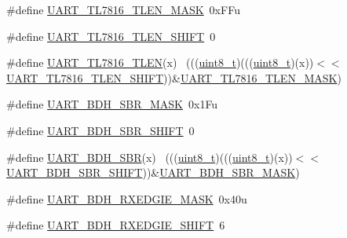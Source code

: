 \begin{DoxyCompactItemize}
\item 
\#define \hyperlink{group___u_a_r_t___register___masks_ga000fb6043015c4cb478d32febfb4a913}{U\+A\+R\+T\+\_\+\+T\+L7816\+\_\+\+T\+L\+E\+N\+\_\+\+M\+A\+SK}~0x\+F\+Fu
\item 
\#define \hyperlink{group___u_a_r_t___register___masks_gaafcee96c5728fbbbc56c3b2ea55bd753}{U\+A\+R\+T\+\_\+\+T\+L7816\+\_\+\+T\+L\+E\+N\+\_\+\+S\+H\+I\+FT}~0
\item 
\#define \hyperlink{group___u_a_r_t___register___masks_ga6665c13844ba2e5f1add9e33a5ae5d66}{U\+A\+R\+T\+\_\+\+T\+L7816\+\_\+\+T\+L\+EN}(x)                                        ~(((\hyperlink{_p_e___types_8h_aba7bc1797add20fe3efdf37ced1182c5}{uint8\+\_\+t})(((\hyperlink{_p_e___types_8h_aba7bc1797add20fe3efdf37ced1182c5}{uint8\+\_\+t})(x))$<$$<$\hyperlink{group___u_a_r_t___register___masks_gaafcee96c5728fbbbc56c3b2ea55bd753}{U\+A\+R\+T\+\_\+\+T\+L7816\+\_\+\+T\+L\+E\+N\+\_\+\+S\+H\+I\+FT}))\&\hyperlink{group___u_a_r_t___register___masks_ga000fb6043015c4cb478d32febfb4a913}{U\+A\+R\+T\+\_\+\+T\+L7816\+\_\+\+T\+L\+E\+N\+\_\+\+M\+A\+SK})
\item 
\#define \hyperlink{group___u_a_r_t___register___masks_ga2680dc8176b0c933b4a1b77c5dbb64b7}{U\+A\+R\+T\+\_\+\+B\+D\+H\+\_\+\+S\+B\+R\+\_\+\+M\+A\+SK}~0x1\+Fu
\item 
\#define \hyperlink{group___u_a_r_t___register___masks_gac38d8a98be282d97c4837597a6c02cda}{U\+A\+R\+T\+\_\+\+B\+D\+H\+\_\+\+S\+B\+R\+\_\+\+S\+H\+I\+FT}~0
\item 
\#define \hyperlink{group___u_a_r_t___register___masks_ga28b137858fb0891d9d7e15f3664803c4}{U\+A\+R\+T\+\_\+\+B\+D\+H\+\_\+\+S\+BR}(x)                                                ~(((\hyperlink{_p_e___types_8h_aba7bc1797add20fe3efdf37ced1182c5}{uint8\+\_\+t})(((\hyperlink{_p_e___types_8h_aba7bc1797add20fe3efdf37ced1182c5}{uint8\+\_\+t})(x))$<$$<$\hyperlink{group___u_a_r_t___register___masks_gac38d8a98be282d97c4837597a6c02cda}{U\+A\+R\+T\+\_\+\+B\+D\+H\+\_\+\+S\+B\+R\+\_\+\+S\+H\+I\+FT}))\&\hyperlink{group___u_a_r_t___register___masks_ga2680dc8176b0c933b4a1b77c5dbb64b7}{U\+A\+R\+T\+\_\+\+B\+D\+H\+\_\+\+S\+B\+R\+\_\+\+M\+A\+SK})
\item 
\#define \hyperlink{group___u_a_r_t___register___masks_ga0882debd8f2c52d4ab8461b22b6519d9}{U\+A\+R\+T\+\_\+\+B\+D\+H\+\_\+\+R\+X\+E\+D\+G\+I\+E\+\_\+\+M\+A\+SK}~0x40u
\item 
\#define \hyperlink{group___u_a_r_t___register___masks_ga97c5d15ae3144492e364744236aa10f7}{U\+A\+R\+T\+\_\+\+B\+D\+H\+\_\+\+R\+X\+E\+D\+G\+I\+E\+\_\+\+S\+H\+I\+FT}~6

\end{DoxyCompactItemize}
